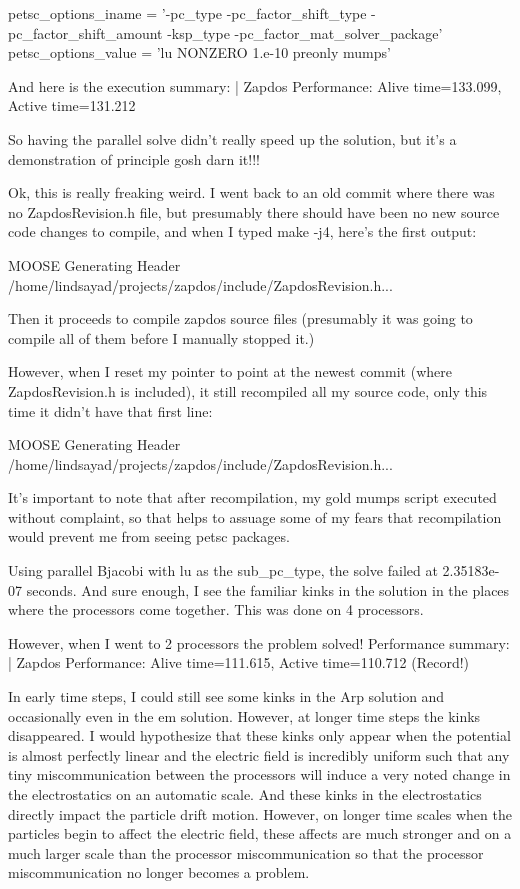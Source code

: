   petsc_options_iname = '-pc_type -pc_factor_shift_type -pc_factor_shift_amount -ksp_type -pc_factor_mat_solver_package'
  petsc_options_value = 'lu NONZERO 1.e-10 preonly mumps'

And here is the execution summary: | Zapdos Performance: Alive time=133.099, Active time=131.212

So having the parallel solve didn't really speed up the solution, but it's a demonstration of principle gosh darn it!!!

Ok, this is really freaking weird. I went back to an old commit where there was no ZapdosRevision.h file, but presumably there should have been no new source code changes to compile, and when I typed make -j4, here's the first output:

MOOSE Generating Header /home/lindsayad/projects/zapdos/include/ZapdosRevision.h...

Then it proceeds to compile zapdos source files (presumably it was going to compile all of them before I manually stopped it.)

However, when I reset my pointer to point at the newest commit (where ZapdosRevision.h is included), it still recompiled all my source code, only this time it didn't have that first line:

MOOSE Generating Header /home/lindsayad/projects/zapdos/include/ZapdosRevision.h...

It's important to note that after recompilation, my gold mumps script executed without complaint, so that helps to assuage some of my fears that recompilation would prevent me from seeing petsc packages.

Using parallel Bjacobi with lu as the sub_pc_type, the solve failed at 2.35183e-07 seconds. And sure enough, I see the familiar kinks in the solution in the places where the processors come together. This was done on 4 processors.

However, when I went to 2 processors the problem solved! Performance summary: | Zapdos Performance: Alive time=111.615, Active time=110.712 (Record!)

In early time steps, I could still see some kinks in the Arp solution and occasionally even in the em solution. However, at longer time steps the kinks disappeared. I would hypothesize that these kinks only appear when the potential is almost perfectly linear and the electric field is incredibly uniform such that any tiny miscommunication between the processors will induce a very noted change in the electrostatics on an automatic scale. And these kinks in the electrostatics directly impact the particle drift motion. However, on longer time scales when the particles begin to affect the electric field, these affects are much stronger and on a much larger scale than the processor miscommunication so that the processor miscommunication no longer becomes a problem.

